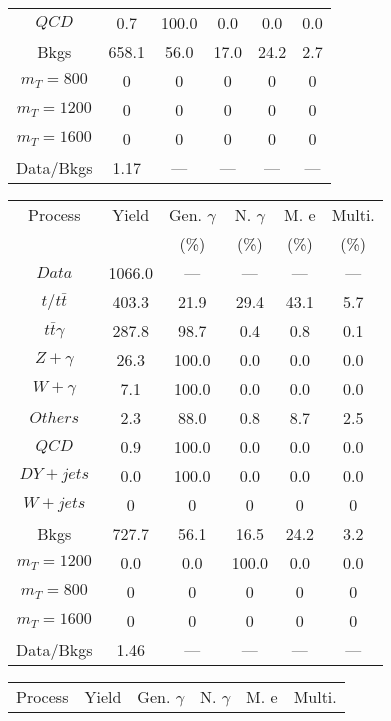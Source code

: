 \begin{figure}
\begin{minipage}[c]{0.32\textwidth}
{\begin{tabular}{cccccc}
$ QCD $ &  0.7 &  100.0 &  0.0 &  0.0 &  0.0\\
Bkgs &  658.1 &  56.0 &  17.0 &  24.2 &  2.7\\
$ m_{T} = 800 $ &  0 &  0 &  0 &  0 &  0\\
$ m_{T} = 1200 $ &  0 &  0 &  0 &  0 &  0\\
$ m_{T} = 1600 $ &  0 &  0 &  0 &  0 &  0\\
Data/Bkgs &  1.17 &  --- &  --- &  --- &  ---\\
\hline
\end{tabular}
}
\end{minipage}
\begin{minipage}[c]{0.32\textwidth}
\centering
\tiny{
\begin{tabular}{cccccc}
\hline
Process & Yield & Gen. $\gamma$ & N. $\gamma$ & M. e & Multi. \\
 &  & (\%) & (\%) & (\%) & (\%)  \\
\hline
                                                                      $ Data $ &  1066.0 &  --- &  --- &  --- &  ---\\
$ t/t\bar{t} $ &  403.3 &  21.9 &  29.4 &  43.1 &  5.7\\
$ t\bar{t}\gamma $ &  287.8 &  98.7 &  0.4 &  0.8 &  0.1\\
$ Z+\gamma $ &  26.3 &  100.0 &  0.0 &  0.0 &  0.0\\
$ W+\gamma $ &  7.1 &  100.0 &  0.0 &  0.0 &  0.0\\
$ Others $ &  2.3 &  88.0 &  0.8 &  8.7 &  2.5\\
$ QCD $ &  0.9 &  100.0 &  0.0 &  0.0 &  0.0\\
$ DY+jets $ &  0.0 &  100.0 &  0.0 &  0.0 &  0.0\\
$ W+jets $ &  0 &  0 &  0 &  0 &  0\\
Bkgs &  727.7 &  56.1 &  16.5 &  24.2 &  3.2\\
$ m_{T} = 1200 $ &  0.0 &  0.0 &  100.0 &  0.0 &  0.0\\
$ m_{T} = 800 $ &  0 &  0 &  0 &  0 &  0\\
$ m_{T} = 1600 $ &  0 &  0 &  0 &  0 &  0\\
Data/Bkgs &  1.46 &  --- &  --- &  --- &  ---\\
\hline
\end{tabular}
}
\end{minipage}
\begin{minipage}[c]{0.32\textwidth}
\centering
\tiny{
\begin{tabular}{cccccc}
\hline
Process & Yield & Gen. $\gamma$ & N. $\gamma$ & M. e & Multi. \\

\end{tabular}}
\end{minipage}
\end{figure}
